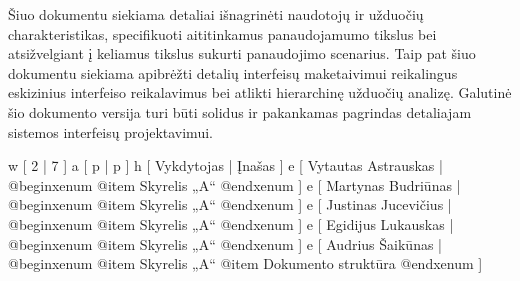 
Šiuo dokumentu siekiama detaliai išnagrinėti naudotojų ir užduočių charakteristikas,
specifikuoti aititinkamus panaudojamumo tikslus bei atsižvelgiant į keliamus tikslus 
sukurti panaudojimo scenarius. Taip pat šiuo dokumentu siekiama apibrėžti detalių
interfeisų maketaivimui reikalingus eskizinius interfeiso reikalavimus bei atlikti
hierarchinę užduočių analizę. Galutinė šio dokumento versija turi būti solidus ir
pakankamas pagrindas detaliajam sistemos interfeisų projektavimui.

\xtable
{
  w [ 2  | 7 ]
  a [ p  | p ]
  h [ Vykdytojas | Įnašas ]
  e [ Vytautas Astrauskas 
  | @begin{xenum} 
      @item Skyrelis „A“
    @end{xenum}
  ]
  e [ Martynas Budriūnas
  | @begin{xenum} 
      @item Skyrelis „A“
    @end{xenum}
  ]
  e [ Justinas Jucevičius 
  | @begin{xenum} 
      @item Skyrelis „A“
    @end{xenum}
  ]
  e [ Egidijus Lukauskas 
  | @begin{xenum} 
      @item Skyrelis „A“
    @end{xenum}
  ]
  e [ Audrius Šaikūnas 
  | @begin{xenum} 
      @item Skyrelis „A“
      @item Dokumento struktūra
    @end{xenum}
  ]
}
